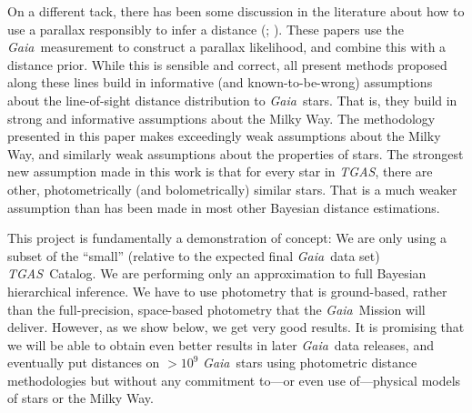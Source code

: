 \documentclass[modern]{aastex61}
\newcommand{\acronym}[1]{{\small{#1}}}
\newcommand{\project}[1]{\textsl{#1}}
\newcommand{\tgas}{\project{\acronym{TGAS}}}
\newcommand{\gaia}{\project{Gaia}}
\begin{document}
On a different tack, there has been some discussion in the literature
about how to use a parallax responsibly to infer a distance (\citealt{astraatmadja16a}; \citealt{astraatmadja16b}).
These papers use the \gaia\ measurement to construct a parallax likelihood,
and combine this with a distance prior.
While this is sensible and correct, all present methods proposed along
these lines build in informative (and known-to-be-wrong) assumptions
about the line-of-sight distance distribution to \gaia\ stars.
That is, they build in strong and informative assumptions about the Milky
Way.
The methodology presented in this paper makes exceedingly weak assumptions
about the Milky Way, and similarly weak assumptions about the properties of
stars.
The strongest new assumption made in this work is that for every star
in \tgas, there are other, photometrically (and bolometrically)
similar stars.
That is a much weaker assumption than has been made in most other Bayesian
distance estimations.

This project is fundamentally a demonstration of concept:
We are only using a subset of the ``small'' (relative to the expected final \gaia\ data set)
\tgas\ Catalog.
We are performing only an approximation to full Bayesian hierarchical inference.
We have to use photometry that is ground-based, rather than the full-precision,
space-based photometry that the \gaia\ Mission will deliver.
However, as we show below, we get very good results.
It is promising that we will be able to obtain even better results
in later \gaia\ data releases, and eventually put distances on $>10^9$
\gaia\ stars using photometric distance methodologies but without any
commitment to---or even use of---physical models of stars or the Milky Way.
\end{document}
